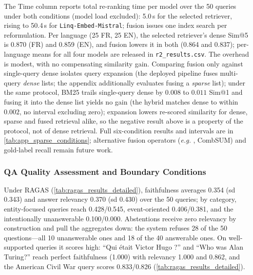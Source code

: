 \documentclass[11pt]{article}
\newcommand{\eg}{\textit{e.g. }}
\begin{document}
The Time column reports total re-ranking time per model over the 50 queries under both conditions (model load excluded): 5.0\,s for the selected retriever, rising to 50.4\,s for \texttt{Linq-Embed-Mistral}; fusion issues one index search per reformulation. Per language (25 FR, 25 EN), the selected retriever's dense Sim@5 is 0.870 (FR) and 0.859 (EN), and fusion lowers it in both (0.864 and 0.837); per-language means for all four models are released in \texttt{r2\_results.csv}. The overhead is modest, with no compensating similarity gain. Comparing fusion only against single-query dense isolates query expansion (the deployed pipeline fuses multi-query \emph{dense} lists; the appendix additionally evaluates fusing a \emph{sparse} list); under the same protocol, BM25 trails single-query dense by \(0.008\) to \(0.011\) Sim@1 and fusing it into the dense list yields no gain (the hybrid matches dense to within \(0.002\), no interval excluding zero); expansion lowers re-scored similarity for dense, sparse and fused retrieval alike, so the negative result above is a property of the protocol, not of dense retrieval. Full six-condition results and intervals are in \cref{tab:app_sparse_conditions}; alternative fusion operators (\eg, CombSUM) and gold-label recall remain future work.

\subsubsection{QA Quality Assessment and Boundary Conditions}
Under RAGAS (\cref{tab:ragas_results_detailed}), faithfulness averages 0.354 (sd 0.343) and answer relevancy 0.370 (sd 0.430) over the 50 queries; by category, entity-focused queries reach 0.428/0.545, event-oriented 0.406/0.381, and the intentionally unanswerable 0.100/0.000. Abstentions receive zero relevancy by construction and pull the aggregates down: the system refuses 28 of the 50 questions---all 10 unanswerable ones and 18 of the 40 answerable ones. On well-supported queries it scores high: ``{\ttfamily Qui était Victor Hugo ?}'' and ``{\ttfamily Who was Alan Turing?}'' reach perfect faithfulness (1.000) with relevancy 1.000 and 0.862, and the American Civil War query scores 0.833/0.826 (\cref{tab:ragas_results_detailed}). 
\end{document}
